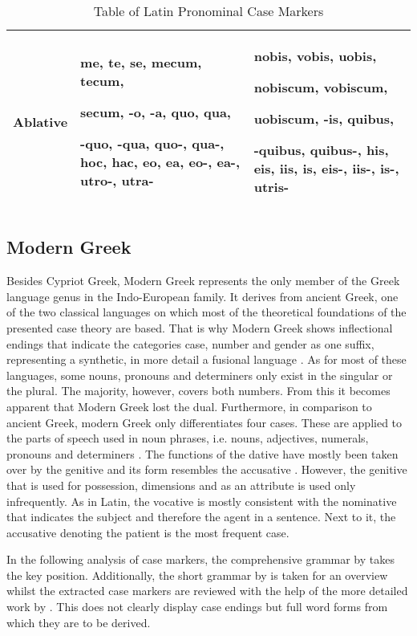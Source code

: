\documentclass[11pt,a4paper,twoside,openright]{scrbook}
\begin{document}
\begin{table}[!htbp]
\begin{tabular}{|p{}||p{5cm}|p{5cm}|}
 \hline
 Ablative & me, te, se, mecum, tecum, \par secum, -o, -a, quo, qua, \par -quo, -qua, quo-, qua-, hoc, hac, eo, ea, eo-, ea-, utro-, utra-  & nobis, vobis, uobis, \par nobiscum, vobiscum, \par uobiscum, -is, quibus, \par -quibus, quibus-, his, eis, iis, is, eis-, iis-, is-, utris- \\ [1ex]
 \hline
\end{tabular}
\caption{Table of Latin Pronominal Case Markers}
\label{table:latin_pronouns}
\end{table}

\newpage




\subsection{Modern Greek}

Besides Cypriot Greek, Modern Greek represents the only member of the Greek language genus in the Indo-European family. It derives from ancient Greek, one of the two classical languages on which most of the theoretical foundations of the presented case theory are based. That is why Modern Greek shows inflectional endings that indicate the categories case, number and gender as one suffix, representing a synthetic, in more detail a fusional language \citep{holton2016greek}. As for most of these languages, some nouns, pronouns and determiners only exist in the singular or the plural. The majority, however, covers both numbers. From this it becomes apparent that Modern Greek lost the dual. Furthermore, in comparison to ancient Greek, modern Greek only differentiates four cases. These are applied to the parts of speech used in noun phrases, i.e. nouns, adjectives, numerals, pronouns and determiners \citep{holton2016greek}.  The functions of the dative have mostly been taken over by the genitive and its form resembles the accusative \citep{metger1998greek}. However, the genitive that is used for possession, dimensions and as an attribute is used only infrequently. As in Latin, the vocative is mostly consistent with the nominative that indicates the subject and therefore the agent in a sentence. Next to it, the accusative denoting the patient is the most frequent case. 

In the following analysis of case markers, the comprehensive grammar by  \citet{holton2016greek} takes the key position. Additionally, the short grammar by \citet{metger1998greek} is taken for an overview whilst the extracted case markers are reviewed with the help of the more detailed work by \citet{ruge2001greek}. This does not clearly display case endings but full word forms from which they are to be derived.
\end{document}
